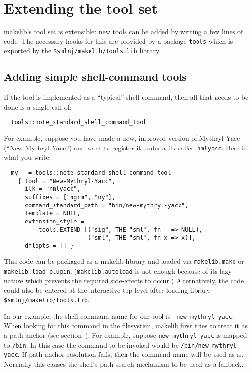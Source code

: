 
\section{Extending the tool set}
\label{sec:moretools}

makelib's tool set is extensible: new tools can be added by writing a few
lines of code.  The necessary hooks for this are provided by a
package {\tt tools} which is exported by the {\tt \$smlnj/makelib/tools.lib}
library.

\subsection{Adding simple shell-command tools}
\label{sec:addshellilk}

If the tool is implemented as a ``typical'' shell command, then all
that needs to be done is a single call of:

\begin{verbatim}
  tools::note_standard_shell_command_tool
\end{verbatim}

For example, suppose you have made a
new, improved version of Mythryl-Yacc (``New-Mythryl-Yacc'') and want to
register it under a ilk called {\tt nmlyacc}.  Here is what you
write:

\begin{verbatim}
  my _ = tools::note_standard_shell_command_tool
    { tool = "New-Mythryl-Yacc",
      ilk = "nmlyacc",
      suffixes = ["ngrm", "ny"],
      command_standard_path = "bin/new-mythryl-yacc",
      template = NULL,
      extension_style =
          tools.EXTEND [("sig", THE "sml", fn _ => NULL),
                        ("sml", THE "sml", fn x => x)],
      dflopts = [] }
\end{verbatim}

This code can be packaged as a makelib library and loaded via {\tt makelib.make}
or {\tt makelib.load\_plugin}.  ({\tt makelib.autoload} is not enough because of
its lazy nature which prevents the required side-effects to occur.)
Alternatively, the code could also be entered at the interactive top
level after loading library {\tt \$smlnj/makelib/tools.lib}.

In our example, the shell command name for our tool is {\tt
new-mythryl-yacc}.  When looking for this command in the filesystem, makelib
first tries to treat it as a path anchor (see
section~).  For example, suppose {\tt new-mythryl-yacc} is
mapped to {\tt /bin}.  In this case the command to be
invoked would be {\tt /bin/new-mythryl-yacc}.  If path anchor resolution
fails, then the command name will be used as-is.  Normally this
causes the shell's path search mechanism to be used as a fallback.

